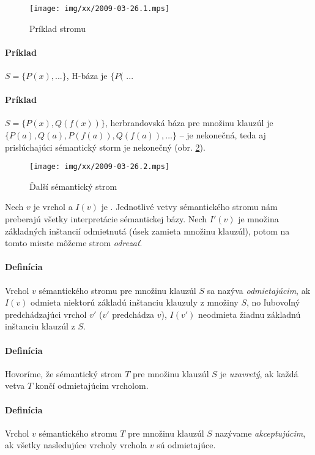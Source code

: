 \begin{figure}[h]
	\centering\texttt{[image: img/xx/2009-03-26.1.mps]}
	\caption{Príklad stromu}
	\label{0326_tree1}
\end{figure}
\paragraph{Príklad}
$S=\{P(x), ... \}$, H-báza je $\{P($ ... \todo{}

\paragraph{Príklad} $S=\{P(x), Q(f(x)) \}$, herbrandovská báza pre množinu
klauzúl je $\{ P(a), Q(a), P(f(a)), Q(f(a)), \ldots \}$ -- je nekonečná, teda aj
prislúchajúci sémantický storm je nekonečný (obr. \ref{0326_tree2}). %
\begin{figure}[h]
	\centering\texttt{[image: img/xx/2009-03-26.2.mps]}
	\caption{Ďalší sémantický strom}
	\label{0326_tree2}
\end{figure}

Nech $v$ je vrchol a $I(v)$ je \todo{}. Jednotlivé vetvy sémantického stromu nám
preberajú všetky interpretácie sémantickej bázy. Nech $I'(v)$ je množina
základných inštancií odmietnutá (úsek zamieta množinu klauzúl), potom na tomto
mieste môžeme strom \emph{odrezať}.

\paragraph{Definícia} Vrchol $v$ sémantického stromu pre množinu klauzúl $S$ sa
nazýva \emph{odmietajúcim}, ak  $I(v)$ odmieta niektorú základú inštanciu
klauzuly z množiny $S$, no ľubovoľný predchádzajúci vrchol $v'$ ($v'$ predchádza
$v$), $I(v')$ neodmieta žiadnu základnú inštanciu klauzúl z $S$.

\paragraph{Definícia}  Hovoríme, že sémantický strom $T$ pre množinu klauzúl $S$
je \emph{uzavretý}, ak každá vetva $T$ končí odmietajúcim vrcholom.

\paragraph{Definícia} Vrchol $v$ sémantického  stromu
$T$ pre  množinu klauzúl $S$ nazývame \emph{akceptujúcim}, ak všetky nasledujúce
vrcholy vrchola $v$ sú odmietajúce.

